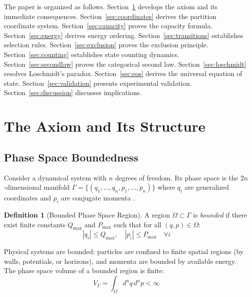 \documentclass[twocolumn,10pt,a4paper]{article}
\theoremstyle{definition}
\newtheorem{definition}[theorem]{Definition}
\theoremstyle{remark}
\begin{document}
The paper is organized as follows. Section~\ref{sec:axiom} develops the axiom and its immediate consequences. Section~\ref{sec:coordinates} derives the partition coordinate system. Section~\ref{sec:capacity} proves the capacity formula. Section~\ref{sec:energy} derives energy ordering. Section~\ref{sec:transitions} establishes selection rules. Section~\ref{sec:exclusion} proves the exclusion principle. Section~\ref{sec:counting} establishes state counting dynamics. Section~\ref{sec:secondlaw} proves the categorical second law. Section~\ref{sec:loschmidt} resolves Loschmidt's paradox. Section~\ref{sec:eos} derives the universal equation of state. Section~\ref{sec:validation} presents experimental validation. Section~\ref{sec:discussion} discusses implications.

\section{The Axiom and Its Structure}
\label{sec:axiom}

\subsection{Phase Space Boundedness}

Consider a dynamical system with $n$ degrees of freedom. Its phase space is the $2n$-dimensional manifold $\Gamma = \{(q_1, \ldots, q_n, p_1, \ldots, p_n)\}$ where $q_i$ are generalized coordinates and $p_i$ are conjugate momenta \cite{arnold1989}.

\begin{definition}[Bounded Phase Space Region]
A region $\Omega \subset \Gamma$ is \emph{bounded} if there exist finite constants $Q_{\max}$ and $P_{\max}$ such that for all $(q, p) \in \Omega$:
\begin{equation}
    |q_i| \leq Q_{\max}, \quad |p_i| \leq P_{\max} \quad \forall i
\end{equation}
\end{definition}

Physical systems are bounded: particles are confined to finite spatial regions (by walls, potentials, or horizons), and momenta are bounded by available energy. The phase space volume of a bounded region is finite:
\begin{equation}
    V_\Gamma = \int_\Omega d^n q \, d^n p < \infty
\end{equation}
\end{document}
